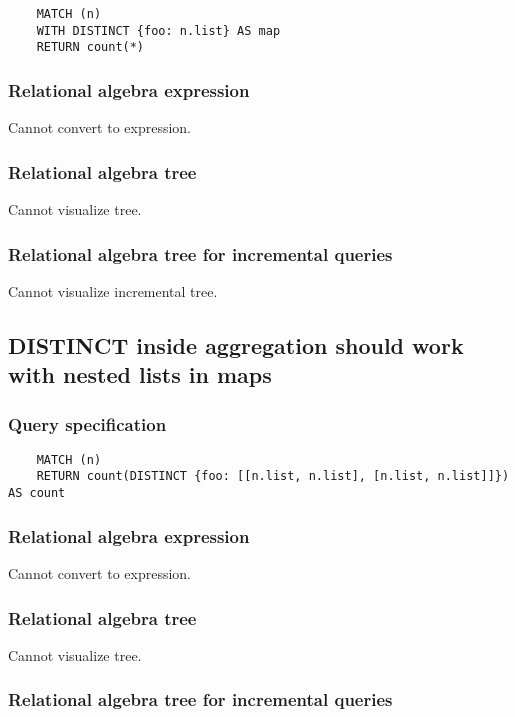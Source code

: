 	\begin{lstlisting}
	MATCH (n)
	WITH DISTINCT {foo: n.list} AS map
	RETURN count(*)
	\end{lstlisting}


	\subsubsection*{Relational algebra expression}

	Cannot convert to expression.

	\subsubsection*{Relational algebra tree}

	Cannot visualize tree.

	\subsubsection*{Relational algebra tree for incremental queries}

	Cannot visualize incremental tree.
	\subsection{DISTINCT inside aggregation should work with nested lists in maps}

	\subsubsection*{Query specification}

	\begin{lstlisting}
	MATCH (n)
	RETURN count(DISTINCT {foo: [[n.list, n.list], [n.list, n.list]]}) AS count
	\end{lstlisting}


	\subsubsection*{Relational algebra expression}

	Cannot convert to expression.

	\subsubsection*{Relational algebra tree}

	Cannot visualize tree.

	\subsubsection*{Relational algebra tree for incremental queries}

